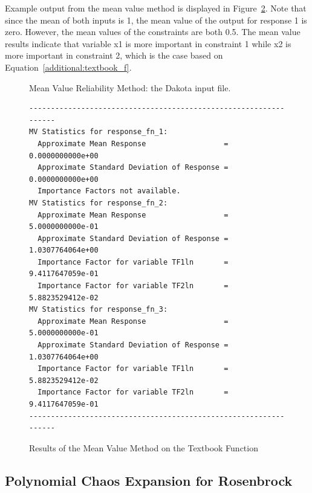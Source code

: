 Example output from the mean value method is displayed in 
Figure~\ref{uq:examples:mv_results}. Note that since the mean of both inputs
is 1, the mean value of the output for response 1 is zero. 
However, the mean values of the constraints are both 0.5. 
The mean value results indicate that variable x1 is more 
important in constraint 1 while x2 is more important in constraint 2, 
which is the case based on Equation~\ref{additional:textbook_f}.

\begin{figure}[ht!]
  \centering
  \begin{bigbox}
    \begin{small}
    \end{small}
  \end{bigbox}
  \caption{Mean Value Reliability Method: the Dakota input file.}
  \label{uq:examples:mv_input}
\end{figure}

\begin{figure}
\centering
\begin{bigbox}
\begin{small}
\begin{verbatim}
-----------------------------------------------------------------
MV Statistics for response_fn_1:
  Approximate Mean Response                  =  0.0000000000e+00
  Approximate Standard Deviation of Response =  0.0000000000e+00
  Importance Factors not available.
MV Statistics for response_fn_2:
  Approximate Mean Response                  =  5.0000000000e-01
  Approximate Standard Deviation of Response =  1.0307764064e+00
  Importance Factor for variable TF1ln       =  9.4117647059e-01
  Importance Factor for variable TF2ln       =  5.8823529412e-02
MV Statistics for response_fn_3:
  Approximate Mean Response                  =  5.0000000000e-01
  Approximate Standard Deviation of Response =  1.0307764064e+00
  Importance Factor for variable TF1ln       =  5.8823529412e-02
  Importance Factor for variable TF2ln       =  9.4117647059e-01
-----------------------------------------------------------------
\end{verbatim}
\end{small}
\end{bigbox}
\caption{Results of the Mean Value Method on the Textbook Function}
\label{uq:examples:mv_results}
\end{figure}


\subsection{Polynomial Chaos Expansion for Rosenbrock}\label{uq:examples:pce}

